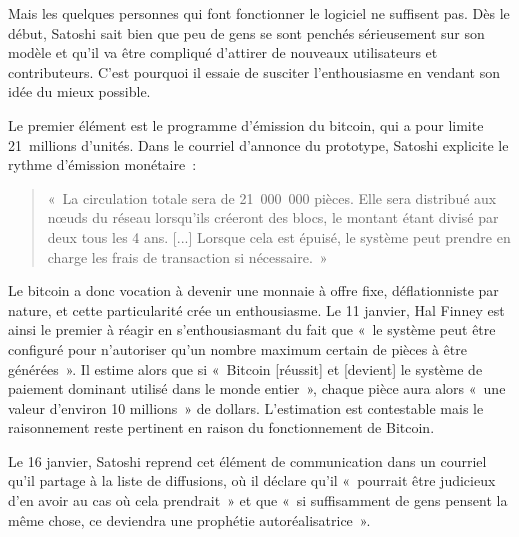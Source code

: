 

Mais les quelques personnes qui font fonctionner le logiciel ne suffisent pas. Dès le début, Satoshi sait bien que peu de gens se sont penchés sérieusement sur son modèle et qu'il va être compliqué d'attirer de nouveaux utilisateurs et contributeurs. C'est pourquoi il essaie de susciter l'enthousiasme en vendant son idée du mieux possible.


Le premier élément est le programme d'émission du bitcoin, qui a pour limite 21~millions d'unités. Dans le courriel d'annonce du prototype, Satoshi explicite le rythme d'émission monétaire~:

\begin{quote}
«~La circulation totale sera de 21~000~000 pièces. Elle sera distribué aux nœuds du réseau lorsqu'ils créeront des blocs, le montant étant divisé par deux tous les 4 ans. [...] Lorsque cela est épuisé, le système peut prendre en charge les frais de transaction si nécessaire.~»
\end{quote}

Le bitcoin a donc vocation à devenir une monnaie à offre fixe, déflationniste par nature, et cette particularité crée un enthousiasme. Le 11 janvier, Hal Finney est ainsi le premier à réagir en s'enthousiasmant du fait que «~le système peut être configuré pour n'autoriser qu'un nombre maximum certain de pièces à être générées~». Il estime alors que si «~Bitcoin [réussit] et [devient] le système de paiement dominant utilisé dans le monde entier~», chaque pièce aura alors «~une valeur d'environ 10 millions~» de dollars. L'estimation est contestable mais le raisonnement reste pertinent en raison du fonctionnement de Bitcoin. 

Le 16 janvier, Satoshi reprend cet élément de communication dans un courriel qu'il partage à la liste de diffusions, où il déclare qu'il «~pourrait être judicieux d'en avoir au cas où cela prendrait~» et que «~si suffisamment de gens pensent la même chose, ce deviendra une prophétie autoréalisatrice~».

